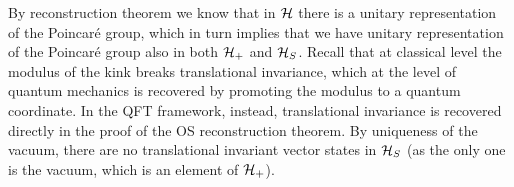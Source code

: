\documentclass[../main/main.tex]{subfiles}
\begin{document}
\skipline

By reconstruction theorem we know that in $\mathcal H$ there is a unitary representation of the Poincaré group, which in turn implies that we have unitary representation of the Poincaré group also in both $\mathcal H_+$ and $\mathcal H_S$.  Recall that at classical level the modulus of the kink breaks translational invariance, which at the level of quantum mechanics is recovered by promoting the modulus to a quantum coordinate. In the QFT framework, instead, translational invariance is recovered directly in the proof of the OS reconstruction theorem.
By uniqueness of the vacuum, there are no translational invariant vector states in $\mathcal H_S$ (as the only one is the vacuum, which is an element of $\mathcal H_+$). 
\end{document}
